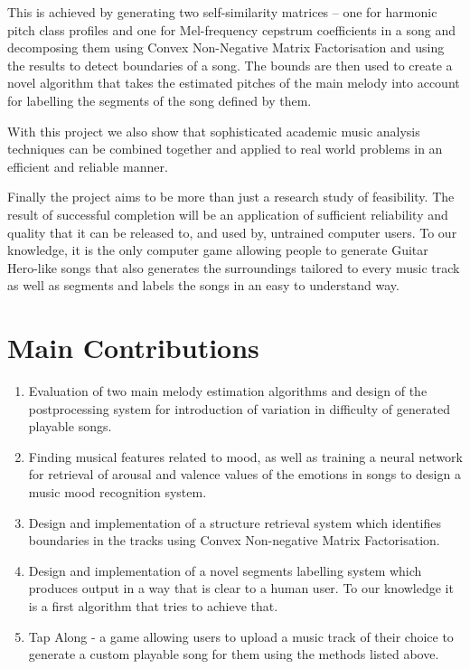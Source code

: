 This is achieved by generating two self-similarity matrices -- one for harmonic pitch class profiles and one for Mel-frequency cepstrum coefficients in a song and decomposing them using Convex Non-Negative Matrix Factorisation and using the results to detect boundaries of a song. The bounds are then used to create a novel algorithm that takes the estimated pitches of the main melody into account for labelling the segments of the song defined by them.

With this project we also show that sophisticated academic music analysis techniques can be combined together and applied to real world problems in an efficient and reliable manner. 

Finally the project aims to be more than just a research study of feasibility. The result of successful completion will be an application of sufficient reliability and quality that it can be released to, and used by, untrained computer users. To our knowledge, it is the only computer game allowing people to generate Guitar Hero-like songs that also generates the surroundings tailored to every music track as well as segments and labels the songs in an easy to understand way.

\section*{Main Contributions}

\begin{enumerate}
\item Evaluation of two main melody estimation algorithms and design of the postprocessing system for introduction of variation in difficulty of generated playable songs.
\item Finding musical features related to mood, as well as training a neural network for retrieval of arousal and valence values of the emotions in songs to design a music mood recognition system.
\item Design and implementation of a structure retrieval system which identifies boundaries in the tracks using Convex Non-negative Matrix Factorisation.
\item Design and implementation of a novel segments labelling system which produces output in a way that is clear to a human user. To our knowledge it is a first algorithm that tries to achieve that.
\item Tap Along - a game allowing users to upload a music track of their choice to generate a custom playable song for them using the methods listed above.
\end{enumerate}


